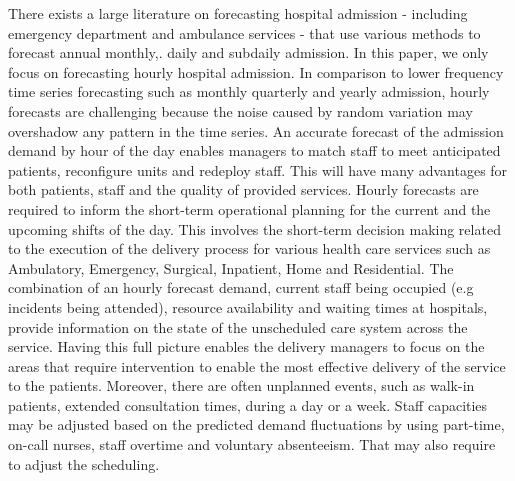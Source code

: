 \documentclass[]{elsarticle} %
\begin{document}
There exists a large literature on forecasting hospital admission - including emergency department and ambulance services - that use various methods to forecast annual\citep{tandberg1994time} monthly,\citep{chen2011long, mai2015predicting}. daily\citep{rostami2020anticipating, park2019144} and subdaily \citep{schweigler2009forecasting, cheng2021forecasting} admission. In this paper, we only focus on forecasting hourly hospital admission. In comparison to lower frequency time series forecasting such as monthly quarterly and yearly admission, hourly forecasts are challenging because the noise caused by random variation may overshadow any pattern in the time series.
An accurate forecast of the admission demand by hour of the day enables managers to match staff to meet anticipated patients, reconfigure units and redeploy staff. This will have many advantages for both patients, staff and the quality of provided services. Hourly forecasts are required to inform the short-term operational planning for the current and the upcoming shifts of the day. This involves the short-term decision making related to the execution of the delivery process for various health care services such as Ambulatory, Emergency, Surgical, Inpatient, Home and Residential. The combination of an hourly forecast demand, current staff being occupied (e.g incidents being attended), resource availability and waiting times at hospitals, provide information on the state of the unscheduled care system across the service. Having this full picture enables the delivery managers to focus on the areas that require intervention to enable the most effective delivery of the service to the patients. Moreover, there are often unplanned events, such as walk-in patients, extended consultation times, during a day or a week. Staff capacities may be adjusted based on the predicted demand fluctuations by using part-time, on-call nurses, staff overtime and voluntary absenteeism. That may also require to adjust the scheduling.
\end{document}
